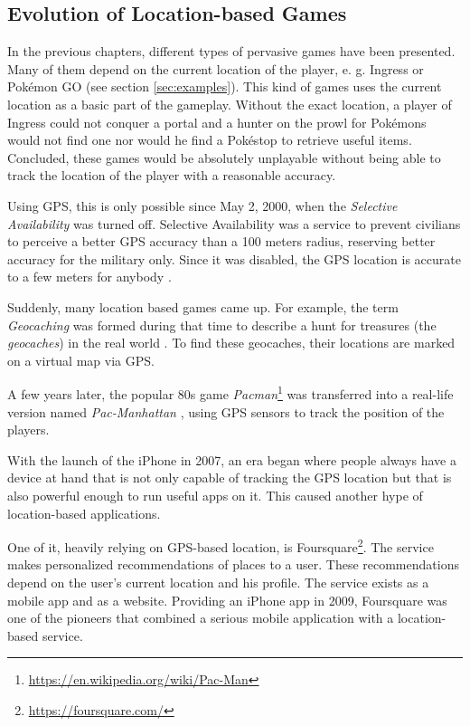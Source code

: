 \subsection{Evolution of Location-based Games}\label{sec:locationBasedGames}
In the previous chapters, different types of pervasive games have been presented. Many of them depend on the current location of the player, e. g. Ingress or Pok\'{e}mon GO (see section \ref{sec:examples}). This kind of games uses the current location as a basic part of the gameplay. Without the exact location, a player of Ingress could not conquer a portal and a hunter on the prowl for Pok\'{e}mons would not find one nor would he find a Pok\'{e}stop to retrieve useful items. Concluded, these games would be absolutely unplayable without being able to track the location of the player with a reasonable accuracy.

Using GPS, this is only possible since May 2, 2000, when the \emph{Selective Availability} was turned off. Selective Availability was a service to prevent civilians to perceive a better GPS accuracy than a 100 meters radius, reserving better accuracy for the military only. Since it was disabled, the GPS location is accurate to a few meters for anybody \citep{SelectiveAvailability}.

Suddenly, many location based games came up. For example, the term \emph{Geocaching} was formed during that time to describe a hunt for treasures (the \emph{geocaches}) in the real world \citep{Geocaching}. To find these geocaches, their locations are marked on a virtual map via GPS.

A few years later, the popular 80s game \emph{Pacman}\footnote{\url{https://en.wikipedia.org/wiki/Pac-Man}} was transferred into a real-life version named \emph{Pac-Manhattan} \citep{Pac-Manhattan}, using GPS sensors to track the position of the players.

With the launch of the iPhone in 2007, an era began where people always have a device at hand that is not only capable of tracking the GPS location but that is also powerful enough to run useful apps on it. This caused another hype of location-based applications.

One of it, heavily relying on GPS-based location, is Foursquare\footnote{\url{https://foursquare.com/}}. The service makes personalized recommendations of places to a user. These recommendations depend on the user's current location and his profile. The service exists as a mobile app and as a website. Providing an iPhone app in 2009, Foursquare was one of the pioneers that combined a serious mobile application with a location-based service.

